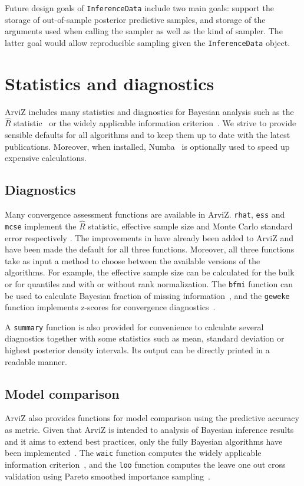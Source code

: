 \documentclass[anonymous=false, %
               format=acmsmall, %
               review=true, %
               screen=true, %
               nonacm=true]{acmart}
\begin{document}
Future design goals of \texttt{InferenceData} include two main goals:
support the storage of out-of-sample posterior predictive samples,
and storage of the arguments used
when calling the sampler as well as the kind of sampler. The latter goal
would allow reproducible sampling given the \texttt{InferenceData} object.

\section{Statistics and diagnostics}\label{sec:stats}
ArviZ includes many statistics and diagnostics for Bayesian
analysis such as the $\hat{R}$ statistic~\cite{gelman1992rhat, vehtari2019rank} or the
widely applicable information criterion~\cite{watanabe2010waic}.
We strive to provide sensible defaults for all algorithms and to
keep them up to date with the latest publications. Moreover, when installed,
Numba~\cite{lam2015numba} is optionally used to
speed up expensive calculations.

\subsection{Diagnostics}
Many convergence assessment functions are available in ArviZ.
\texttt{rhat}, \texttt{ess} and \texttt{mcse}
implement the $\hat{R}$ statistic, effective sample size and Monte Carlo
standard error respectively \cite{gelman1992rhat, gelman2013bayesian}. %
The improvements in \citet{vehtari2019rank} have already been added to
ArviZ and have been made the default for all three functions. Moreover, all
three functions take
as input a method to choose between the available versions of the algorithms.
For example, the effective sample size can be calculated for the bulk or for
quantiles and with or without rank normalization.
The \texttt{bfmi} function can be used to calculate Bayesian fraction
of missing information~\cite{betancourt2016diagnosing}, and the \texttt{geweke} function
implements z-scores for convergence diagnostics~\cite{geweke1991evaluating}.

A \texttt{summary} function is also provided for convenience to calculate
several diagnostics together with some statistics such as mean, standard deviation
or highest posterior density intervals.
Its output can be directly printed in a readable manner.

\subsection{Model comparison}
ArviZ also provides functions for model comparison using the predictive
accuracy as metric. Given that ArviZ is intended to analysis of Bayesian
inference results and it aims to extend best practices, only the fully
Bayesian algorithms have been implemented~\cite{gelman2014understanding}.
The \texttt{waic} function computes the
widely applicable information criterion~\cite{watanabe2010waic}, and the
\texttt{loo} function computes the leave one out cross validation using Pareto
smoothed importance sampling~\cite{vehtari2015pareto, vehtari2017practical}.
\end{document}
